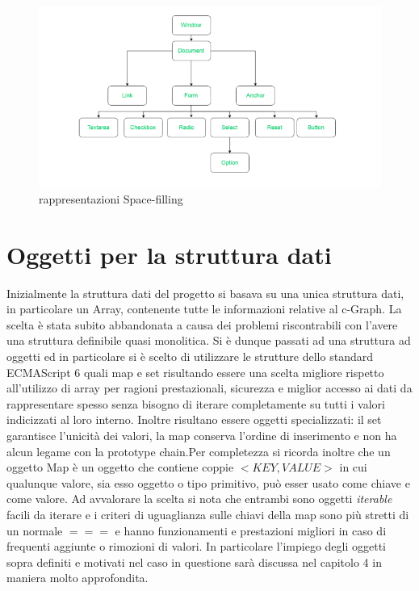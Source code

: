 {\begin{figure}[!htb]
	\begin{center}
		\includegraphics[width=0.8 \linewidth]{figure/dom}
	\end{center}
	\caption{rappresentazioni Space-filling\label{fig:dom}}
\end{figure}

\section{Oggetti per la struttura dati}
Inizialmente la struttura dati del progetto si basava su una unica struttura dati, in particolare un Array, contenente tutte le informazioni relative al c-Graph. La scelta è stata subito abbandonata a causa dei problemi riscontrabili con l'avere una struttura definibile quasi monolitica. Si è dunque passati ad una struttura ad oggetti ed in particolare si è scelto di utilizzare le strutture dello standard ECMAScript 6 quali map e set risultando essere una scelta migliore rispetto all'utilizzo di array per ragioni prestazionali, sicurezza e miglior accesso ai dati da rappresentare spesso senza bisogno di iterare completamente su tutti i valori indicizzati al loro interno. Inoltre risultano essere oggetti specializzati: il set garantisce l'unicità dei valori, la map conserva l'ordine di inserimento e non ha alcun legame con la prototype chain.Per completezza si ricorda inoltre che un oggetto Map è un oggetto che contiene coppie $<KEY,VALUE>$ in cui qualunque valore, sia esso oggetto o tipo primitivo, può esser usato come chiave e come valore. Ad avvalorare la scelta si nota che entrambi sono oggetti \textit{iterable} facili da iterare e i criteri di uguaglianza sulle chiavi della map sono più stretti di un normale $===$ e hanno funzionamenti e prestazioni migliori in caso di frequenti aggiunte o rimozioni di valori.
In particolare l'impiego degli oggetti sopra definiti e motivati nel caso in questione sarà discussa nel capitolo 4 in maniera molto approfondita.
}